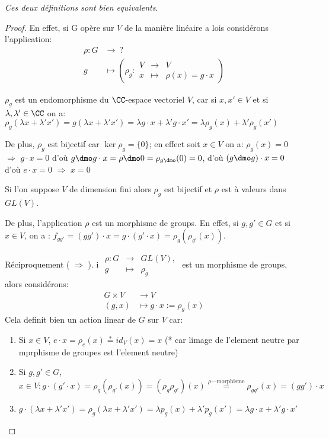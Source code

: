 \emph{Ces deux définitions sont bien equivalents}.
\begin{proof}
En effet, si G opère sur $V$ de la manière linéaire a lois considérons l'application:
\begin{align*}	
	\rho:G &\rightarrow \ ? \\
	g &\mapsto  \left(\rho_g:\begin{array}{rcl}V&\rightarrow& V \\ x&\mapsto&\rho(x)=g\cdot x\end{array}\right)
\end{align*}

$\rho_g$ est un endomorphisme du $\CC$-espace vectoriel $V$, car si $x,x'\in V$ et si $\lambda, \lambda'\in \CC$ on a:
$\rho_g(\lambda x + \lambda' x')=g(\lambda x+\lambda' x')=\lambda g\cdot x+\lambda'g\cdot x'=\lambda\rho_g(x)+\lambda'\rho_g(x')$

De plus, $\rho_g$ est bijectif car $\ker\rho_g=\{0\}$; en effect soit $x\in V$ on a: $\rho_g(x)=0$  $\Rightarrow$  $g\cdot x=0$ d'où $g\dmo g\cdot x= \rho\dmo 0=\rho_{g\dmo}(0)=0$,
d'où $(g\dmo g)\cdot x=0$ d'où $e\cdot x=0$  $\Rightarrow$  $x=0$

Si l'on suppose $V$ de dimension fini alors $\rho_g$ est bijectif et $\rho$ est à valeurs dans $GL(V)$.

De plus, l'application $\rho$ est un morphisme de groups. En effet, si $g,g'\in G$ et si $x\in V$, on a : $f_{gg'}=(gg')\cdot x= g\cdot (g'\cdot x)=\rho_g(\rho_{g'}(x))$.

Réciproquement ( $\Rightarrow$ ).
i $\begin{array}{rcl}\rho: G &\rightarrow & GL(V),\\ g &\mapsto &\rho_g\end{array}$ est un morphisme de groups, alors considérons: 
\begin{align*}
G\times V &\rightarrow  V\\ (g,x) &\mapsto g\cdot x:=\rho_g(x)
\end{align*}
Cela definit bien un action linear de $G$ sur $V$ car:
\begin{enumerate}
	\item Si $x\in V$, $e\cdot x=\rho_e(x) \overset\ast= id_V(x)=x$ (* car limage de l'element neutre par mprphisme de groupes est l'element neutre)
	\item Si $g,g'\in G$, $x\in V: g\cdot(g'\cdot x)=\rho_g(\rho_{g'}(x))=(\rho_g\rho_{g'})(x)\overset{\rho\text{---morphisme}}{=}\rho_{gg'}(x)=(gg')\cdot x$
	\item $g\cdot (\lambda x+\lambda'x')=\rho_g(\lambda x+\lambda' x')= \lambda p_g(x)+\lambda' p_g(x')=\lambda g\cdot x+\lambda'g\cdot x'$
\end{enumerate}
\end{proof}

